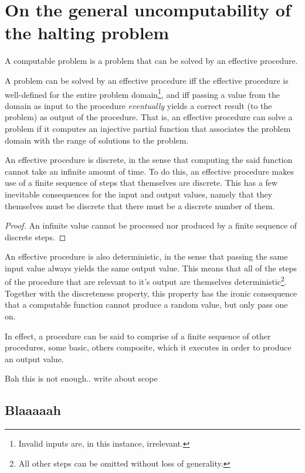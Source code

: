 \chapter{On the general uncomputability of the halting problem}

A computable problem is a problem that can be solved by an effective procedure.

A problem can be solved by an effective procedure iff the effective procedure
is well-defined for the entire problem domain\footnote{Invalid inputs are, in
this instance, irrelevant.}, and iff passing a value from the domain as input
to the procedure \emph{eventually} yields a correct result (to the problem) as
output of the procedure. That is, an effective procedure can solve a problem if
it computes an injective partial function that associates the problem domain
with the range of solutions to the problem.

An effective procedure is discrete, in the sense that computing the said
function cannot take an infinite amount of time. To do this, an effective
procedure makes use of a finite sequence of steps that themselves are discrete.
This has a few inevitable consequences for the input and output values, namely
that they themselves must be discrete that there must be a discrete number of
them.

\begin{proof} An infinite value cannot be processed nor produced by a finite
sequence of discrete steps.\end{proof}

An effective procedure is also deterministic, in the sense that passing the
same input value always yields the same output value. This means that all of
the steps of the procedure that are relevant to it's output are themselves
deterministic\footnote{All other steps can be omitted without loss of
generality.}. Together with the discreteness property, this property has the
ironic consequence that a computable function cannot produce a random value,
but only pass one on\cite{knuth-random}.

In effect, a procedure can be said to comprise of a finite sequence of other
procedures, some basic, others composite, which it executes in order to produce
an output value.

Bah this is not enough.. write about scope


\section{Blaaaaah}


